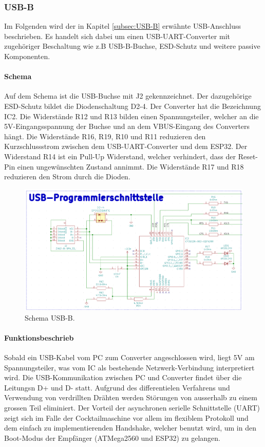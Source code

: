 \clearpage
\subsubsection{USB-B}
\label{subsubsec:USB-B}

Im Folgenden wird der in Kapitel \ref{subsec:USB-B} erwähnte USB-Anschluss beschrieben. Es handelt sich dabei um einen USB-UART-Converter mit zugehöriger Beschaltung wie z.B USB-B-Buchse, ESD-Schutz und weitere passive Komponenten.

\paragraph{Schema}\mbox{}

Auf dem Schema ist die USB-Buchse mit J2 gekennzeichnet. Der dazugehörige ESD-Schutz bildet die Diodenschaltung D2-4. Der Converter hat die Bezeichnung IC2. Die Widerstände R12 und R13 bilden einen Spannungsteiler, welcher an die 5V-Eingangsspannung der Buchse und an dem VBUS-Eingang des Converters hängt. Die Widerstände R16, R19, R10 und R11 reduzieren den Kurzschlussstrom zwischen dem USB-UART-Converter und dem ESP32. Der Widerstand R14 ist ein Pull-Up Widerstand, welcher verhindert, dass der Reset-Pin einen ungewünschten Zustand annimmt. Die Widerstände R17 und R18 reduzieren den Strom durch die Dioden.

\begin{figure}[h!]
	\centering
	\includegraphics[width=1\textwidth]{graphics/Schema_USB_B}
	\caption{Schema USB-B.}
	\label{fig:Schema_USB_B}
\end{figure}

\paragraph{Funktionsbeschrieb}\mbox{}

Sobald ein USB-Kabel vom PC zum Converter angeschlossen wird, liegt 5V am Spannungsteiler, was vom IC als bestehende Netzwerk-Verbindung interpretiert wird. Die USB-Kommunikation zwischen PC und Converter findet über die Leitungsn D+ und D- statt. Aufgrund des differentielen Verfahrens und Verwendung von verdrillten Drähten werden Störungen von ausserhalb zu einem grossen Teil eliminiert. Der Vorteil der asynchronen serielle Schnittstelle (UART) zeigt sich im Falle der Cocktailmaschine vor allem im flexiblem Protokoll und dem einfach zu implementierenden Handshake, welcher benutzt wird, um in den Boot-Modus der Empfänger (ATMega2560 und ESP32) zu gelangen.